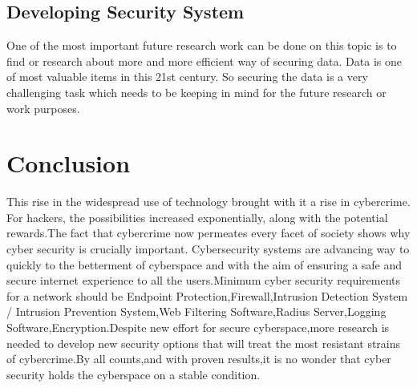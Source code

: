 \documentclass[conference,double column]{IEEEtran}
\begin{document}
	\subsection{Developing Security System}
	One of the most important future research work can be done on this topic is to find or research about more and more efficient way of securing data. Data is one of most valuable items in this 21st century. So securing the data is a very challenging task which needs to be keeping in mind for the future research or work purposes.
	
	
	\section{Conclusion} 
	This rise in the widespread use of technology
	brought with it a rise in cybercrime. For hackers, the
	possibilities increased exponentially, along with the
	potential rewards.The fact that cybercrime now permeates every facet of society shows why cyber security is crucially important. Cybersecurity systems are advancing way to quickly to the betterment of cyberspace and with the aim of ensuring a safe and secure internet
	experience to all the users.Minimum cyber security requirements for a network should be Endpoint Protection,Firewall,Intrusion Detection System / Intrusion Prevention System,Web Filtering Software,Radius Server,Logging Software,Encryption.Despite new effort for secure cyberspace,more research is needed to develop new security options that will treat the most resistant strains of cybercrime.By all counts,and with proven results,it is no wonder that cyber security holds the cyberspace on a stable condition.

	 
	
\end{document}
